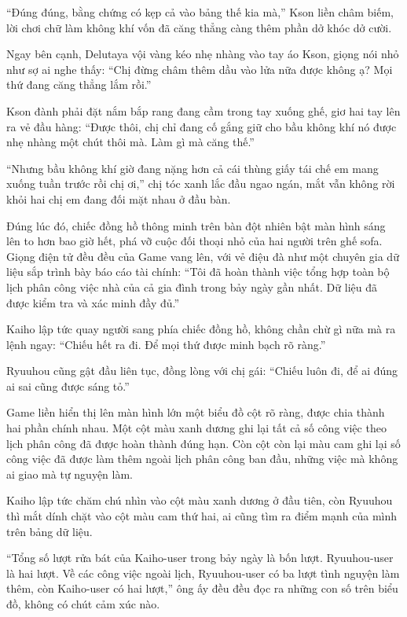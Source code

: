 \documentclass[../main.tex]{subfiles}
\begin{document}
``Đúng đúng, bằng chứng có kẹp cả vào bảng thế kia mà,'' Kson liền châm biếm, lời chơi chữ làm không khí vốn đã căng thẳng càng thêm phần dở khóc dở cười.

Ngay bên cạnh, Delutaya vội vàng kéo nhẹ nhàng vào tay áo Kson, giọng nói nhỏ như sợ ai nghe thấy: ``Chị đừng châm thêm dầu vào lửa nữa được không ạ? Mọi thứ đang căng thẳng lắm rồi.''

Kson đành phải đặt nắm bắp rang đang cầm trong tay xuống ghế, giơ hai tay lên ra vẻ đầu hàng: ``Được thôi, chị chỉ đang cố gắng giữ cho bầu không khí nó được nhẹ nhàng một chút thôi mà. Làm gì mà căng thế.''

``Nhưng bầu không khí giờ đang nặng hơn cả cái thùng giấy tái chế em mang xuống tuần trước rồi chị ơi,'' chị tóc xanh lắc đầu ngao ngán, mắt vẫn không rời khỏi hai chị em đang đối mặt nhau ở đầu bàn.

Đúng lúc đó, chiếc đồng hồ thông minh trên bàn đột nhiên bật màn hình sáng lên to hơn bao giờ hết, phá vỡ cuộc đối thoại nhỏ của hai người trên ghế sofa. Giọng điện tử đều đều của Game vang lên, với vẻ điệu đà như một chuyên gia dữ liệu sắp trình bày báo cáo tài chính: ``Tôi đã hoàn thành việc tổng hợp toàn bộ lịch phân công việc nhà của cả gia đình trong bảy ngày gần nhất. Dữ liệu đã được kiểm tra và xác minh đầy đủ.''

Kaiho lập tức quay người sang phía chiếc đồng hồ, không chần chừ gì nữa mà ra lệnh ngay: ``Chiếu hết ra đi. Để mọi thứ được minh bạch rõ ràng.''

Ryuuhou cũng gật đầu liên tục, đồng lòng với chị gái: ``Chiếu luôn đi, để ai đúng ai sai cũng được sáng tỏ.''

Game liền hiển thị lên màn hình lớn một biểu đồ cột rõ ràng, được chia thành hai phần chính nhau. Một cột màu xanh dương ghi lại tất cả số công việc theo lịch phân công đã được hoàn thành đúng hạn. Còn cột còn lại màu cam ghi lại số công việc đã được làm thêm ngoài lịch phân công ban đầu, những việc mà không ai giao mà tự nguyện làm.

Kaiho lập tức chăm chú nhìn vào cột màu xanh dương ở đầu tiên, còn Ryuuhou thì mắt dính chặt vào cột màu cam thứ hai, ai cũng tìm ra điểm mạnh của mình trên bảng dữ liệu.

``Tổng số lượt rửa bát của Kaiho-user trong bảy ngày là bốn lượt. Ryuuhou-user là hai lượt. Về các công việc ngoài lịch, Ryuuhou-user có ba lượt tình nguyện làm thêm, còn Kaiho-user có hai lượt,'' ông ấy đều đều đọc ra những con số trên biểu đồ, không có chút cảm xúc nào.
\end{document}

